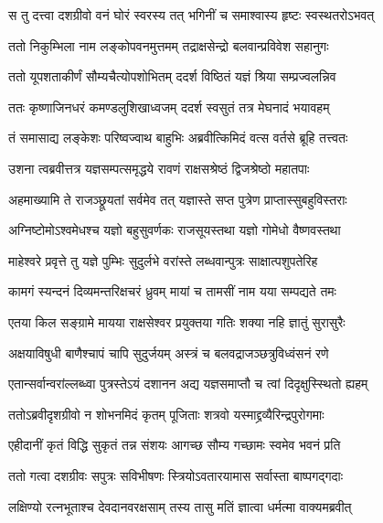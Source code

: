 
\twolineshloka
{स तु दत्त्वा दशग्रीवो वनं घोरं स्वरस्य तत्}
{भगिनीं च समाश्वास्य हृष्टः स्वस्थतरोऽभवत्} %

\twolineshloka
{ततो निकुम्भिला नाम लङ्कोपवनमुत्तमम्}
{तद्राक्षसेन्द्रो बलवान्प्रविवेश सहानुगः} %

\twolineshloka
{ततो यूपशताकीर्णं सौम्यचैत्योपशोभितम्}
{ददर्श विष्ठितं यज्ञं श्रिया सम्प्रज्वलन्निव} %

\twolineshloka
{ततः कृष्णाजिनधरं कमण्डलुशिखाध्वजम्}
{ददर्श स्वसुतं तत्र मेघनादं भयावहम्} %

\twolineshloka
{तं समासाद्य लङ्केशः परिष्वज्वाथ बाहुभिः}
{अब्रवीत्किमिदं वत्स वर्तसे ब्रूहि तत्त्वतः} %

\twolineshloka
{उशना त्वब्रवीत्तत्र यज्ञसम्पत्समृद्धये}
{रावणं राक्षसश्रेष्ठं द्विजश्रेष्ठो महातपाः} %

\twolineshloka
{अहमाख्यामि ते राजञ्छ्रूयतां सर्वमेव तत्}
{यज्ञास्ते सप्त पुत्रेण प्राप्तास्सुबहुविस्तराः} %

\twolineshloka
{अग्निष्टोमोऽश्वमेधश्च यज्ञो बहुसुवर्णकः}
{राजसूयस्तथा यज्ञो गोमेधो वैष्णवस्तथा} %

\twolineshloka
{माहेश्वरे प्रवृत्ते तु यज्ञे पुम्भिः सुदुर्लभे}
{वरांस्ते लब्धवान्पुत्रः साक्षात्पशुपतेरिह} %

\twolineshloka
{कामगं स्यन्दनं दिव्यमन्तरिक्षचरं ध्रुवम्}
{मायां च तामसीं नाम यया सम्पद्यते तमः} %

\twolineshloka
{एतया किल सङ्ग्रामे मायया राक्षसेश्वर}
{प्रयुक्तया गतिः शक्या नहि ज्ञातुं सुरासुरैः} %

\twolineshloka
{अक्षयाविषुधी बाणैश्चापं चापि सुदुर्जयम्}
{अस्त्रं च बलवद्राजञ्छत्रुविध्वंसनं रणे} %

\twolineshloka
{एतान्सर्वान्वरांल्लब्ध्वा पुत्रस्तेऽयं दशानन}
{अद्य यज्ञसमाप्तौ च त्वां दिदृक्षुस्स्थितो ह्यहम्} %

\twolineshloka
{ततोऽब्रवीदृशग्रीवो न शोभनमिदं कृतम्}
{पूजिताः शत्रवो यस्माद्द्रव्यैरिन्द्रपुरोगमाः} %

\twolineshloka
{एहीदानीं कृतं विद्धि सुकृतं तन्न संशयः}
{आगच्छ सौम्य गच्छामः स्वमेव भवनं प्रति} %

\twolineshloka
{ततो गत्वा दशग्रीवः सपुत्रः सविभीषणः}
{स्त्रियोऽवतारयामास सर्वास्ता बाष्पगद्गदाः} %

\twolineshloka
{लक्षिण्यो रत्नभूताश्च देवदानवरक्षसाम्}
{तस्य तासु मतिं ज्ञात्वा धर्मत्मा वाक्यमब्रवीत्} %

